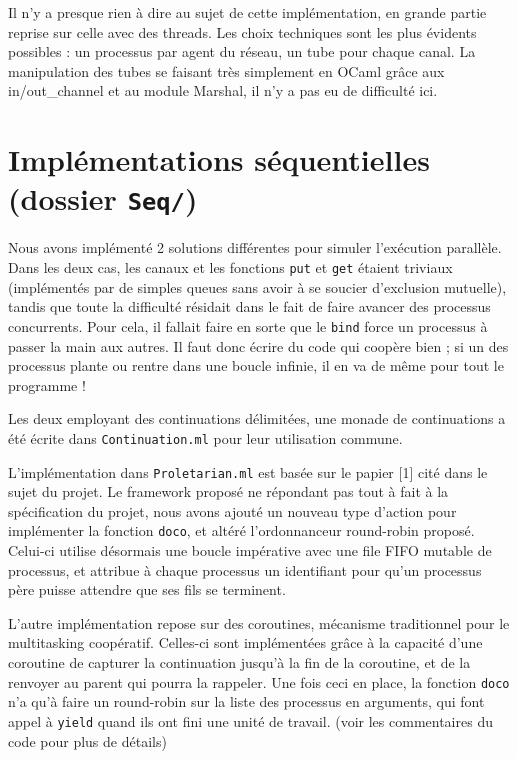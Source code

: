 \documentclass[a4paper, 11pt]{article}
\begin{document}
Il n'y a presque rien à dire au sujet de cette implémentation, en
grande partie reprise sur celle avec des threads. Les choix techniques
sont les plus évidents possibles : un processus par agent du réseau,
un tube pour chaque canal. La manipulation des tubes se faisant très
simplement en OCaml grâce aux in/out\_channel et au module Marshal,
il n'y a pas eu de difficulté ici.


\section*{Implémentations séquentielles (dossier \texttt{Seq/})}

Nous avons implémenté 2 solutions différentes pour simuler l'exécution
parallèle. Dans les deux cas, les canaux et les fonctions \texttt{put}
et \texttt{get} étaient triviaux (implémentés par de simples queues
sans avoir à se soucier d'exclusion mutuelle), tandis que toute la
difficulté résidait dans le fait de faire avancer des processus
concurrents. Pour cela, il fallait faire en sorte que le \texttt{bind}
force un processus à \og passer la main \fg aux autres. Il faut donc
écrire du code qui coopère bien ; si un des processus plante ou rentre
dans une boucle infinie, il en va de même pour tout le programme !

Les deux employant des continuations délimitées, une monade de 
continuations a été écrite dans \texttt{Continuation.ml} pour leur
utilisation commune.

L'implémentation dans \texttt{Proletarian.ml} est basée sur le papier [1]
cité dans le sujet du projet. Le framework proposé ne répondant pas
tout à fait à la spécification du projet, nous avons ajouté un nouveau
type d'action pour implémenter la fonction \texttt{doco}, et altéré
l'ordonnanceur round-robin proposé. Celui-ci utilise désormais une boucle
impérative avec une file FIFO mutable de processus, et attribue à
chaque processus un identifiant pour qu'un processus père puisse
attendre que ses fils se terminent.

L'autre implémentation repose sur des coroutines, mécanisme
traditionnel pour le multitasking coopératif. Celles-ci sont
implémentées grâce à la capacité d'une coroutine de capturer la
continuation jusqu'à la fin de la coroutine, et de la
renvoyer au parent qui pourra la rappeler. Une fois ceci en place, la
fonction \texttt{doco} n'a qu'à faire un round-robin sur la liste
des processus en arguments, qui font appel à \texttt{yield} quand ils
ont fini une unité de travail. (voir les commentaires du code pour
plus de détails)
\end{document}
